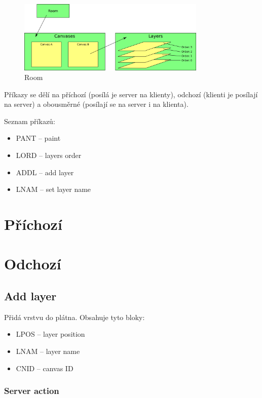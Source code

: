 \documentclass[12pt,oneside,a4paper]{report}
\begin{document}
\begin{figure}[h]
  \centering
  \includegraphics[width=0.80\textwidth]{diagrams/room.png}
  \caption{Room}
  \label{picture.room}
\end{figure}

Příkazy se dělí na příchozí (posílá je server na klienty), odchozí (klienti je posílají na server) a obousměrné (posílají se na server i na klienta).

Seznam příkazů:

\begin{itemize}
	\item PANT -- paint
	\item LORD -- layers order
	\item ADDL -- add layer
	\item LNAM -- set layer name
\end{itemize}

\section{Příchozí}

\section{Odchozí}

\subsection{Add layer}

Přidá vrstvu do plátna. Obsahuje tyto bloky:

\begin{itemize}
	\item LPOS -- layer position
	\item LNAM -- layer name
	\item CNID -- canvas ID
\end{itemize}

\subsubsection{Server action}
\end{document}
